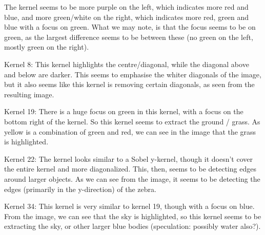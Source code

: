 The kernel seems to be more purple on the left, which indicates more red and blue, and more green/white on the right, which indicates more red, green and blue with a focus on green. What we may note, is that the focus seems to be on green, as the largest difference seems to be between these (no green on the left, mostly green on the right). 

Kernel 8: 
This kernel highlights the centre/diagonal, while the diagonal above and below are darker. This seems to emphasise the whiter diagonals of the image, but it also seems like this kernel is removing certain diagonals, as seen from the resulting image. 

Kernel 19: 
There is a huge focus on green in this kernel, with a focus on the bottom right of the kernel. So this kernel seems to extract the ground / grass. As yellow is a combination of green and red, we can see in the image that the grass is highlighted. 

Kernel 22: 
The kernel looks similar to a Sobel y-kernel, though it doesn't cover the entire kernel and more diagonalized.  This, then, seems to be detecting edges around larger objects. As we can see from the image, it seems to be detecting the edges (primarily in the y-direction) of the zebra. 

Kernel 34: 
This kernel is very similar to kernel 19, though with a focus on blue. From the image, we can see that the sky is highlighted, so this kernel seems to be extracting the sky, or other larger blue bodies (speculation: possibly water also?). 
